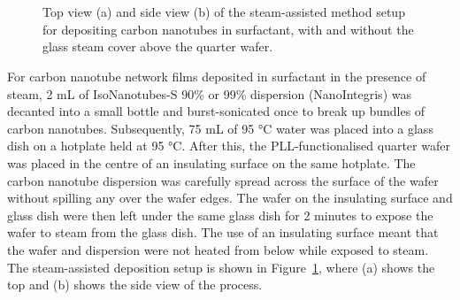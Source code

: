 \documentclass[
  a4paper,
]{scrbook}
\begin{document}
\begin{figure}
\begin{minipage}[t]{0.03\linewidth}
{{}

}

\end{minipage}%
%
\begin{minipage}[t]{0.01\linewidth}

{\centering 

~

}

\end{minipage}%
%
\begin{minipage}[t]{0.45\linewidth}

{\centering 


}

\end{minipage}%
%
\begin{minipage}[t]{0.01\linewidth}

{\centering 

~

}

\end{minipage}%

\caption[Top and side view of the steam-assisted method setup for
depositing carbon nanotubes in
surfactant.]{\label{fig-steaming-method}Top view (a) and side view (b)
of the steam-assisted method setup for depositing carbon nanotubes in
surfactant, with and without the glass steam cover above the quarter
wafer.}

\end{figure}

For carbon nanotube network films deposited in surfactant in the
presence of steam, 2 mL of IsoNanotubes-S 90\% or 99\% dispersion
(NanoIntegris) was decanted into a small bottle and burst-sonicated once
to break up bundles of carbon nanotubes. Subsequently, 75 mL of 95 °C
water was placed into a glass dish on a hotplate held at 95 °C. After
this, the PLL-functionalised quarter wafer was placed in the centre of
an insulating surface on the same hotplate. The carbon nanotube
dispersion was carefully spread across the surface of the wafer without
spilling any over the wafer edges. The wafer on the insulating surface
and glass dish were then left under the same glass dish for 2 minutes to
expose the wafer to steam from the glass dish. The use of an insulating
surface meant that the wafer and dispersion were not heated from below
while exposed to steam. The steam-assisted deposition setup is shown in
Figure~\ref{fig-steaming-method}, where (a) shows the top and (b) shows
the side view of the process.
\end{document}
